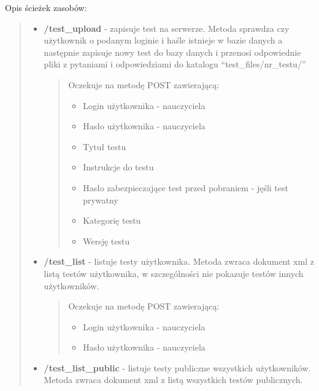 \documentclass[letterpaper,10pt,polish]{manual}
\begin{document}
Opis ścieżek zasobów:
\begin{quote}
\hypertarget{test-upload}{}\begin{itemize}
\item {} 
\textbf{/test\_upload} - zapisuje test na serwerze. Metoda sprawdza czy użytkownik o podanym loginie i haśle istnieje w bazie danych a następnie zapisuje nowy test do bazy danych i przenosi odpowiednie pliki z pytaniami i odpowiedziami do katalogu ``test\_files/nr\_testu/''
\begin{quote}

Oczekuje na metodę POST zawierającą:
\begin{itemize}
\item {} 
Login użytkownika - nauczyciela

\item {} 
Hasło użytkownika - nauczyciela

\item {} 
Tytuł testu

\item {} 
Instrukcje do testu

\item {} 
Hasło zabezpieczające test przed pobraniem - jęśli test prywatny

\item {} 
Kategorię testu

\item {} 
Wersję testu

\end{itemize}
\end{quote}

\end{itemize}
\hypertarget{test-list}{}\begin{itemize}
\item {} 
\textbf{/test\_list} - listuje testy użytkownika. Metoda zwraca dokument xml z listą testów użytkownika, w szczególności nie pokazuje testów innych użytkowników.
\begin{quote}

Oczekuje na metodę POST zawierającą:
\begin{itemize}
\item {} 
Login użytkownika - nauczyciela

\item {} 
Hasło użytkownika - nauczyciela

\end{itemize}
\end{quote}

\end{itemize}
\hypertarget{test-list-public}{}\begin{itemize}
\item {} 
\textbf{/test\_list\_public} - listuje testy publiczne wszystkich użytkowników. Metoda zwraca dokument xml z listą wszystkich testów publicznych.
\begin{quote}


\end{quote}
\end{itemize}
\end{quote}
\end{document}

